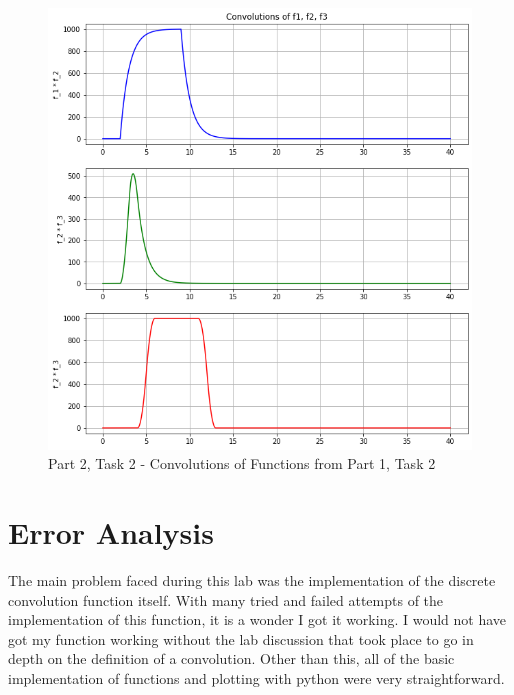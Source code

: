 \documentclass[12pt]{report}
\begin{document}
\begin{figure}[h!]
  \centering
  \includegraphics[scale=0.5]{p2t2.png}
  \caption{Part 2, Task 2 - Convolutions of Functions from Part 1, Task 2}
  \label{fig: p2t2}
\end{figure}
\section{Error Analysis}
The main problem faced during this lab was the implementation of the discrete convolution function itself. With many tried and failed attempts of the implementation
of this function, it is a wonder I got it working. I would not have got my function working without the lab discussion that took place to go in depth on the definition
of a convolution. Other than this, all of the basic implementation of functions and plotting with python were very straightforward.
\end{document}
